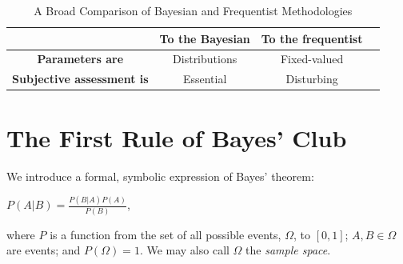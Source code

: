 \documentclass[12pt,twoside]{reedthesis}
\begin{document}
\begin{table}[htdp] %
\caption[Comparison of Bayesian and Frequentist Reasoning]{A Broad Comparison of Bayesian and Frequentist Methodologies} 
\begin{center}
\begin{tabular}{c c c c} 
\toprule %
   &  \textbf{To the Bayesian} & \textbf{To the frequentist} \\ %
  \midrule %
\textbf{Parameters are} & Distributions  & Fixed-valued \\ %
\textbf{Subjective assessment is} & Essential & Disturbing \\
\bottomrule %
\end{tabular}
\end{center}
\label{bvf} %
\end{table}

\section{The First Rule of Bayes' Club}

We introduce a formal, symbolic expression of Bayes' theorem: 

\begin{center}
	$P(A | B) = \displaystyle\frac{P(B | A)P(A)}{P(B)}$,
\end{center}
where $P$ is a function from the set of all possible events, $\Omega$, to $[0,1]$; $A, B \in \Omega$ are events; and $P(\Omega) = 1$. We may also call $\Omega$ the {\em sample space}.
\end{document}
